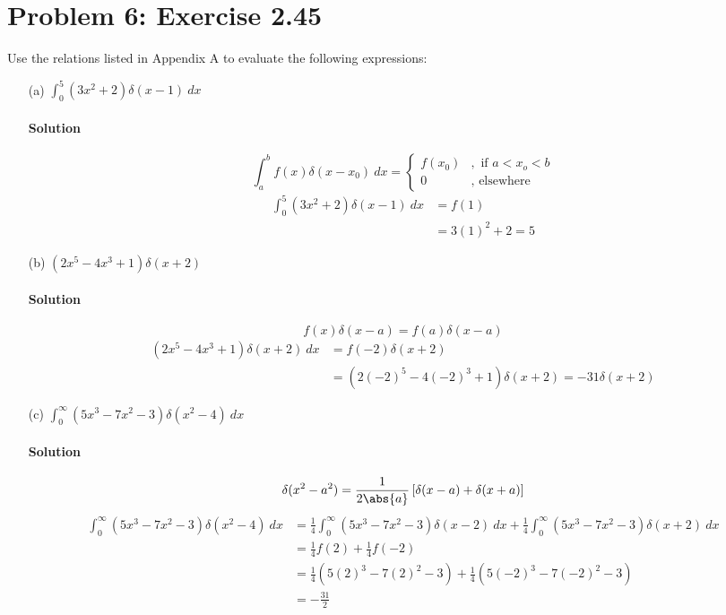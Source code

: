 \documentclass{article}
\begin{document}
	\section*{Problem 6: Exercise 2.45}
	Use the relations listed in Appendix A to evaluate the following expressions: 
	\begin{enumerate}
		\item[(a)] $ \int_{0}^{5} \left( 3x^2 + 2 \right) \delta\left( x - 1 \right) \ dx $
		\paragraph{Solution}
		\[
			\int_{a}^{b} f(x) \delta(x-x_0) \ dx = \begin{cases}
				f(x_0) &, \text{ if } a < x_o < b \\
				0 &, \text{ elsewhere}
			\end{cases}
		\]
		\begin{align*}
			\int_{0}^{5} \left( 3x^2 + 2 \right) \delta\left( x - 1 \right) \ dx &= f(1) \\
			&= 3(1)^2 + 2 = \boxed{5}
		\end{align*}
		
		\item[(b)] $ \left( 2x^5 - 4x^3 + 1 \right) \delta\left( x + 2 \right) $
		\paragraph{Solution}
		\[
			f(x)\delta(x-a) = f(a)\delta(x-a)
		\]
		\begin{align*}
			\left( 2x^5 - 4x^3 + 1 \right) \delta\left( x + 2 \right) \ dx &= f(-2)\delta(x + 2) \\
			&= (2(-2)^5 - 4(-2)^3 + 1)\delta(x + 2) = \boxed{-31\delta(x + 2)}
		\end{align*}
		
		\item[(c)] $ \int_{0}^{\infty} \left( 5x^3 - 7x^2 - 3 \right) \delta\left( x^2 - 4 \right) \ dx $
		\paragraph{Solution}
		\[
			\delta(x^2 - a^2) = \frac{1}{2\abs{a}} \left[ \delta(x - a) + \delta(x + a) \right]
		\]
		\begin{align*}
			\int_{0}^{\infty} \left( 5x^3 - 7x^2 - 3 \right) \delta\left( x^2 - 4 \right) \ dx &= \frac{1}{4} \int_{0}^{\infty} \left( 5x^3 - 7x^2 - 3 \right) \delta\left( x - 2 \right) \ dx + \frac{1}{4} \int_{0}^{\infty} \left( 5x^3 - 7x^2 - 3 \right) \delta\left( x + 2 \right) \ dx \\
			&= \frac{1}{4} f(2) + \frac{1}{4} f(-2) \\
			&= \frac{1}{4} (5(2)^3 - 7(2)^2 - 3) + \frac{1}{4} (5(-2)^3 - 7(-2)^2 - 3) \\
			&= \boxed{-\frac{31}{2}}
		\end{align*}
		
	\end{enumerate}
	
\end{document}
